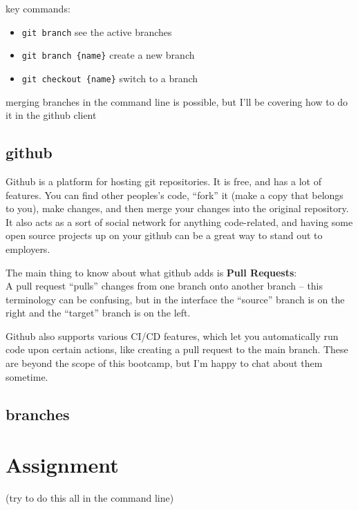 \documentclass[
]{article}
\providecommand{\tightlist}{%
  \setlength{\itemsep}{0pt}\setlength{\parskip}{0pt}}
\begin{document}
key commands:

\begin{itemize}
\tightlist
\item
  \texttt{git\ branch} see the active branches
\item
  \texttt{git\ branch\ \{name\}} create a new branch
\item
  \texttt{git\ checkout\ \{name\}} switch to a branch
\end{itemize}

merging branches in the command line is possible, but I'll be covering
how to do it in the github client

\hypertarget{github}{%
\subsection{github}\label{github}}

Github is a platform for hosting git repositories. It is free, and has a
lot of features. You can find other peoples's code, ``fork'' it (make a
copy that belongs to you), make changes, and then merge your changes
into the original repository. It also acts as a sort of social network
for anything code-related, and having some open source projects up on
your github can be a great way to stand out to employers.

The main thing to know about what github adds is \textbf{Pull
Requests}:\\
A pull request ``pulls'' changes from one branch onto another branch --
this terminology can be confusing, but in the interface the ``source''
branch is on the right and the ``target'' branch is on the left.

Github also supports various CI/CD features, which let you automatically
run code upon certain actions, like creating a pull request to the main
branch. These are beyond the scope of this bootcamp, but I'm happy to
chat about them sometime.

\hypertarget{branches}{%
\subsection{branches}\label{branches}}

\hypertarget{assignment}{%
\section{Assignment}\label{assignment}}

(try to do this all in the command line)
\end{document}
